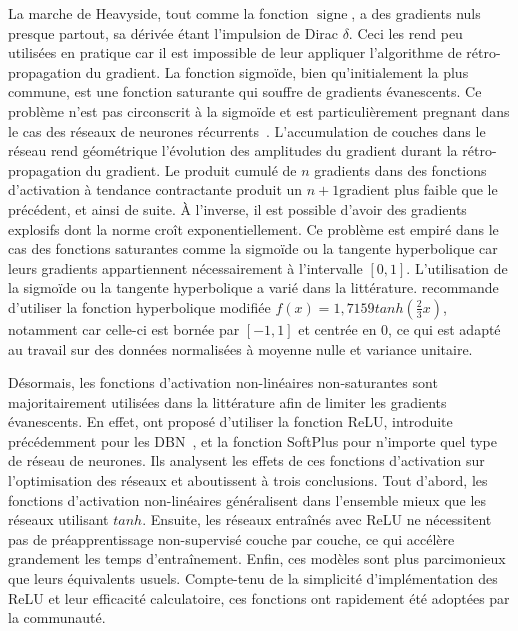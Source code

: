 La marche de Heavyside, tout comme la fonction $\operatorname{signe}$, a des gradients nuls presque partout, sa dérivée étant l'impulsion de Dirac $\delta$. Ceci les rend peu utilisées en pratique car il est impossible de leur appliquer l'algorithme de rétro-propagation du gradient.
La fonction sigmoïde, bien qu'initialement la plus commune, est une fonction saturante qui souffre de gradients évanescents. Ce problème n'est pas circonscrit à la sigmoïde et est particulièrement pregnant dans le cas des réseaux de neurones récurrents~\cite{hochreiter_gradient_2001}. L'accumulation de couches dans le réseau rend géométrique l'évolution des amplitudes du gradient durant la rétro-propagation du gradient. Le produit cumulé de $n$ gradients dans des fonctions d'activation à tendance contractante produit un $n+1$\ieme gradient plus faible que le précédent, et ainsi de suite. À l'inverse, il est possible d'avoir des gradients explosifs dont la norme croît exponentiellement. Ce problème est empiré dans le cas des fonctions saturantes comme la sigmoïde ou la tangente hyperbolique car leurs gradients appartiennent nécessairement à l'intervalle $[0,1]$. L'utilisation de la sigmoïde ou la tangente hyperbolique a varié dans la littérature. \citet{lecun_efficient_1998} recommande d'utiliser la fonction hyperbolique modifiée $f(x) = 1,7159 tanh(\frac{2}{3} x)$, notamment car celle-ci est bornée par $[-1,1]$ et centrée en 0, ce qui est adapté au travail sur des données normalisées à moyenne nulle et variance unitaire.

Désormais, les fonctions d'activation non-linéaires non-saturantes sont majoritairement utilisées dans la littérature afin de limiter les gradients évanescents. En effet, \citet{glorot_deep_2011} ont proposé d'utiliser la fonction \gls{ReLU}, introduite précédemment pour les \gls{DBN}~\cite{nair_rectified_2010}, et la fonction SoftPlus pour n'importe quel type de réseau de neurones. Ils analysent les effets de ces fonctions d'activation sur l'optimisation des réseaux et aboutissent à trois conclusions. Tout d'abord, les fonctions d'activation non-linéaires généralisent dans l'ensemble mieux que les réseaux utilisant $tanh$. Ensuite, les réseaux entraînés avec \gls{ReLU} ne nécessitent pas de préapprentissage non-supervisé couche par couche, ce qui accélère grandement les temps d'entraînement. Enfin, ces modèles sont plus parcimonieux que leurs équivalents usuels. Compte-tenu de la simplicité d'implémentation des \gls{ReLU} et leur efficacité calculatoire, ces fonctions ont rapidement été adoptées par la communauté.

